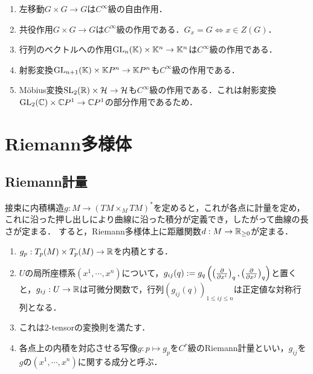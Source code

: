 \documentclass[uplatex,dvipdfmx]{jsreport}
\begin{document}
\begin{example}\mbox{}
    \begin{enumerate}
        \item 左移動$G\times G\to G$は$C^\infty$級の自由作用．
        \item 共役作用$G\times G\to G$は$C^\infty$級の作用である．$G_x=G\Leftrightarrow x\in Z(G)$．
        \item 行列のベクトルへの作用$\mathrm{GL}_n(\mathbb{K})\times\mathbb{K}^n\to\mathbb{K}^n$は$C^\infty$級の作用である．
        \item 射影変換$\mathrm{GL}_{n+1}(\mathbb{K})\times\mathbb{K} P^n\to\mathbb{K} P^n$も$C^\infty$級の作用である．
        \item Möbius変換$\mathrm{SL}_2(\mathbb{R})\times\mathcal{H}\to\mathcal{H}$も$C^\infty$級の作用である．これは射影変換$\mathrm{GL}_2(\mathbb{C})\times\mathbb{C} P^1\to\mathbb{C} P^1$の部分作用であるため．
    \end{enumerate}
\end{example}


\chapter{Riemann多様体}

\section{Riemann計量}

\begin{tcolorbox}[colframe=ForestGreen, colback=ForestGreen!10!white,breakable,colbacktitle=ForestGreen!40!white,coltitle=black,fonttitle=\bfseries\sffamily,
title=]
    接束に内積構造$g:M\to (TM\times_M TM)^*$を定めると，これが各点に計量を定め，これに沿った押し出しにより曲線に沿った積分が定義でき，したがって曲線の長さが定まる．
    すると，Riemann多様体上に距離関数$d:M\to\mathbb{R}_{\ge 0}$が定まる．
\end{tcolorbox}

\begin{definition}\mbox{}
    \begin{enumerate}
        \item $g_p:T_p(M)\times T_p(M)\to\mathbb{R}$を内積とする．
        \item $U$の局所座標系$(x^1,\cdots,x^n)$について，$g_{ij}(q):=g_q\left(\left(\frac{\partial }{\partial x^i}\right)_q,\left(\frac{\partial }{\partial x^j}\right)_q\right)$と置くと，$g_{ij}:U\to\mathbb{R}$は可微分関数で，行列$(g_{ij}(q))_{1\le ij\le n}$は正定値な対称行列となる．
        \item これは2-tensorの変換則を満たす．
        \item 各点上の内積を対応させる写像$g:p\mapsto g_p$を$C^r$級のRiemann計量といい，$g_{ij}$を$g$の$(x^1,\cdots,x^n)$に関する成分と呼ぶ．
    \end{enumerate}
\end{definition}
\end{document}
